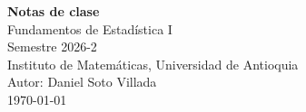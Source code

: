 \documentclass[12pt]{report}
\begin{document}
\begin{center}
    {\Large\textbf{Notas de clase}}\\[0.3em]
    {\large Fundamentos de Estadística I}\\
    Semestre 2026-2\\
    Instituto de Matemáticas, Universidad de Antioquia\\
    Autor: Daniel Soto Villada\\
    \today
\end{center}

\begingroup
\let\clearpage\relax
\let\cleardoublepage\relax
\tableofcontents
\endgroup







\end{document}
